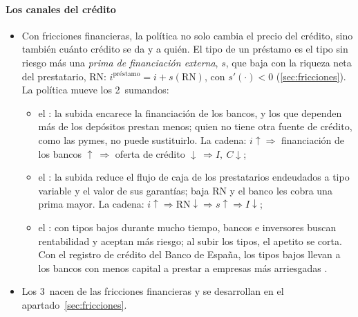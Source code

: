 \documentclass[11pt]{article}
\begin{document}
\paragraph{Los canales del crédito}
\begin{itemize}
\item Con fricciones financieras, la política no solo cambia el precio del crédito, sino también cuánto crédito se da y a quién\nocite{BernankeGertler1995}. El tipo de un préstamo es el tipo sin riesgo más una \emph{prima de financiación externa}, $s$, que baja con la riqueza neta del prestatario, RN: $i^{\text{préstamo}}=i+s(\mathrm{RN})$, con $s'(\cdot)<0$ (\ref{sec:fricciones}). La política mueve los 2~sumandos:
  \begin{itemize}
  \item el : la subida encarece la financiación de los bancos, y los que dependen más de los depósitos prestan menos; quien no tiene otra fuente de crédito, como las pymes, no puede sustituirlo. La cadena: $i\uparrow\Rightarrow$ financiación de los bancos $\uparrow\ \Rightarrow$ oferta de crédito $\downarrow\ \Rightarrow I,\ C\downarrow$;
  \item el : la subida reduce el flujo de caja de los prestatarios endeudados a tipo variable y el valor de sus garantías; baja RN y el banco les cobra una prima mayor. La cadena: $i\uparrow\Rightarrow\mathrm{RN}\downarrow\Rightarrow s\uparrow\Rightarrow I\downarrow$;
  \item el : con tipos bajos durante mucho tiempo, bancos e inversores buscan rentabilidad y aceptan más riesgo; al subir los tipos, el apetito se corta\nocite{BorioZhu2012Capital}. Con el registro de crédito del Banco de España, los tipos bajos llevan a los bancos con menos capital a prestar a empresas más arriesgadas\nocite{JimenezEtAl2014Hazardous} .
  \end{itemize}
\item Los 3~nacen de las fricciones financieras y se desarrollan en el apartado~\ref{sec:fricciones}.
\end{itemize}
\end{document}
